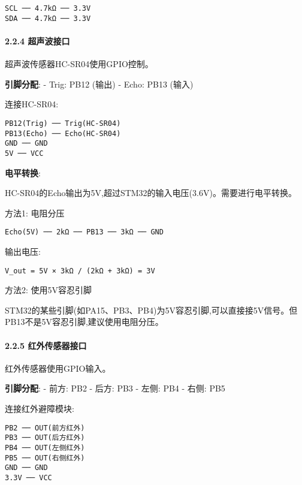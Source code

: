 \documentclass[
]{article}
\begin{document}
\begin{verbatim}
SCL ── 4.7kΩ ── 3.3V
SDA ── 4.7kΩ ── 3.3V
\end{verbatim}

\hypertarget{ux8d85ux58f0ux6ce2ux63a5ux53e3}{%
\paragraph{2.2.4 超声波接口}\label{ux8d85ux58f0ux6ce2ux63a5ux53e3}}

超声波传感器HC-SR04使用GPIO控制。

\textbf{引脚分配}: - Trig: PB12 (输出) - Echo: PB13 (输入)

连接HC-SR04:

\begin{verbatim}
PB12(Trig) ── Trig(HC-SR04)
PB13(Echo) ── Echo(HC-SR04)
GND ── GND
5V ── VCC
\end{verbatim}

\textbf{电平转换}:

HC-SR04的Echo输出为5V,超过STM32的输入电压(3.6V)。需要进行电平转换。

方法1: 电阻分压

\begin{verbatim}
Echo(5V) ── 2kΩ ── PB13 ── 3kΩ ── GND
\end{verbatim}

输出电压:

\begin{verbatim}
V_out = 5V × 3kΩ / (2kΩ + 3kΩ) = 3V
\end{verbatim}

方法2: 使用5V容忍引脚

STM32的某些引脚(如PA15、PB3、PB4)为5V容忍引脚,可以直接接5V信号。但PB13不是5V容忍引脚,建议使用电阻分压。

\hypertarget{ux7ea2ux5916ux4f20ux611fux5668ux63a5ux53e3}{%
\paragraph{2.2.5
红外传感器接口}\label{ux7ea2ux5916ux4f20ux611fux5668ux63a5ux53e3}}

红外传感器使用GPIO输入。

\textbf{引脚分配}: - 前方: PB2 - 后方: PB3 - 左侧: PB4 - 右侧: PB5

连接红外避障模块:

\begin{verbatim}
PB2 ── OUT(前方红外)
PB3 ── OUT(后方红外)
PB4 ── OUT(左侧红外)
PB5 ── OUT(右侧红外)
GND ── GND
3.3V ── VCC
\end{verbatim}
\end{document}
